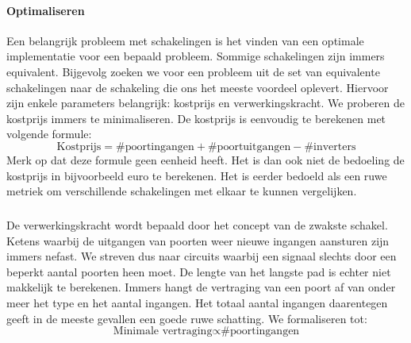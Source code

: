 \paragraph{Optimaliseren}
Een belangrijk probleem met schakelingen is het vinden van een optimale implementatie voor een bepaald probleem. Sommige schakelingen zijn immers equivalent. Bijgevolg zoeken we voor een probleem uit de set van equivalente schakelingen naar de schakeling die ons het meeste voordeel oplevert. Hiervoor zijn enkele parameters belangrijk: kostprijs en verwerkingskracht. We proberen de kostprijs immers te minimaliseren. De kostprijs is eenvoudig te berekenen met volgende formule:
\begin{equation}
\mbox{Kostprijs}=\mbox{\#poortingangen}+\mbox{\#poortuitgangen}-\mbox{\#inverters}
\label{eqn:kosten}
\end{equation}
Merk op dat deze formule geen eenheid heeft. Het is dan ook niet de bedoeling de kostprijs in bijvoorbeeld euro te berekenen. Het is eerder bedoeld als een ruwe metriek om verschillende schakelingen met elkaar te kunnen vergelijken.
\subparagraph{}
De verwerkingskracht wordt bepaald door het concept van de zwakste schakel. Ketens waarbij de uitgangen van poorten weer nieuwe ingangen aansturen zijn immers nefast. We streven dus naar circuits waarbij een signaal slechts door een beperkt aantal poorten heen moet. De lengte van het langste pad is echter niet makkelijk te berekenen. Immers hangt de vertraging van een poort af van onder meer het type en het aantal ingangen. Het totaal aantal ingangen daarentegen geeft in de meeste gevallen een goede ruwe schatting. We formaliseren tot:
\begin{equation}
\mbox{Minimale vertraging}\propto\mbox{\#poortingangen}%
\end{equation}

